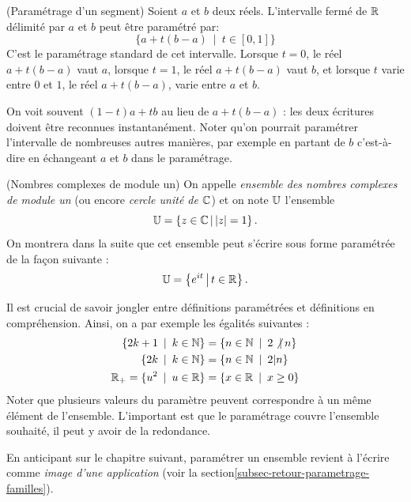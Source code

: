 \begin{exemple} (Paramétrage d'un segment) 
Soient $a$ et $b$ deux réels. L'intervalle fermé de $\mathbb{R}$ délimité par $a$ et $b$ peut être paramétré par:
\[ \{a+t(b-a)\:\mid\: t\in [0,1]\}\]
C'est le paramétrage standard de cet intervalle. Lorsque $t=0$, le réel $a+t(b-a)$ vaut $a$, lorsque $t=1$, le réel $a+t(b-a)$ vaut $b$, et lorsque $t$ varie entre $0$ et $1$, le réel $a+t(b-a)$, varie entre $a$ et $b$.

On voit souvent $(1-t)a+tb$ au lieu de $a+t(b-a)$ : les deux écritures doivent être reconnues instantanément. Noter qu'on pourrait paramétrer l'intervalle de nombreuses autres manières, par exemple en \og partant de $b$\fg{} c'est-à-dire en échangeant $a$ et $b$ dans le paramétrage.
\end{exemple}

\begin{exemple} (Nombres complexes de module un) 
 On appelle \emph{ensemble des nombres complexes de module un} (ou encore \emph{cercle unité de $\mathbb{C}$}) et on note $\mathbb{U}$ l'ensemble 
\[ \U = \ensemble{ z\in \C}{|z|=1}.\]
 On montrera dans la suite que cet ensemble peut s'écrire sous forme paramétrée de la façon suivante :
\[ \U = \ensemble{ e^{it}}{t \in \R}.\]
\end{exemple}

\begin{exemple}
Il est crucial de savoir jongler entre définitions paramétrées et définitions en compréhension. Ainsi, on a par exemple les égalités suivantes :
\begin{align*}
\left\{2k+1 \:\mid\: k\in \N\right\}  &= \left\{ n\in \N\:\mid\: 2\not|\: n\right\} \\
\left\{2k \:\mid\: k\in \N\right\} &=  \left\{ n\in \N\:\mid\: 2| n\right\}\\
\R_+ = \{u^2\:\mid\: u\in \R\} & = \{x\in \R\:\mid\: x\geq 0\}
\end{align*}
Noter que plusieurs valeurs du paramètre peuvent correspondre à un même élément de l'ensemble. L'important est que le paramétrage \og couvre\fg{} l'ensemble souhaité, il peut y avoir de la redondance.
\end{exemple}



\begin{remarque}
En anticipant sur le chapitre suivant, paramétrer un ensemble revient à l'écrire comme \emph{image d'une application} (voir la section\ref{subsec-retour-parametrage-familles}).
\end{remarque}




